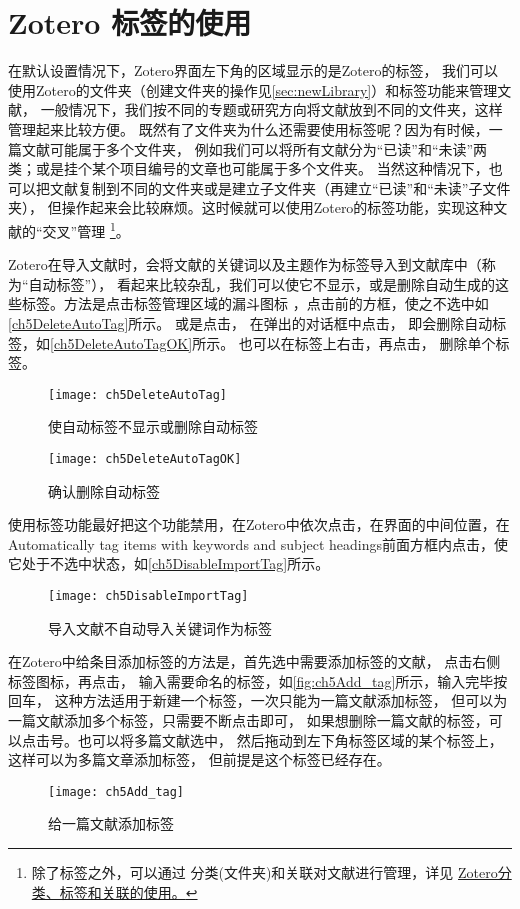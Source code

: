 \documentclass[theorem=false,mathfont=none,openany,sub3section]{easybook}
\begin{document}
{\section{Zotero 标签的使用} \label{sec:tag}
在默认设置情况下，Zotero界面左下角的区域显示的是Zotero的标签，
我们可以使用Zotero的文件夹（创建文件夹的操作见\cref{sec:newLibrary}）和标签功能来管理文献，
一般情况下，我们按不同的专题或研究方向将文献放到不同的文件夹，这样管理起来比较方便。
既然有了文件夹为什么还需要使用标签呢？因为有时候，一篇文献可能属于多个文件夹，
例如我们可以将所有文献分为“已读”和“未读”两类；或是挂个某个项目编号的文章也可能属于多个文件夹。
当然这种情况下，也可以把文献复制到不同的文件夹或是建立子文件夹（再建立“已读”和“未读”子文件夹），
但操作起来会比较麻烦。这时候就可以使用Zotero的标签功能，实现这种文献的“交叉”管理
\footnote{除了标签之外，可以通过
	分类(文件夹)和关联对文献进行管理，详见
	\href{https://zhuanlan.zhihu.com/p/275707703}{Zotero分类、标签和关联的使用。}}。

Zotero在导入文献时，会将文献的关键词以及主题作为标签导入到文献库中（称为“自动标签”），
看起来比较杂乱，我们可以使它不显示，或是删除自动生成的这些标签。方法是点击标签管理区域的漏斗图标
，点击前的方框，使之不选中如\autoref{ch5DeleteAutoTag}所示。
或是点击，
在弹出的对话框中点击，
即会删除自动标签，如\autoref{ch5DeleteAutoTagOK}所示。
也可以在标签上右击，再点击，
删除单个标签。

\begin{figure}[htbp]
	\centering
	\texttt{[image: ch5DeleteAutoTag]}
	\caption{使自动标签不显示或删除自动标签}
	\label{ch5DeleteAutoTag}
\end{figure}
\begin{figure}[htbp]
	\centering
	\texttt{[image: ch5DeleteAutoTagOK]}
	\caption{确认删除自动标签}
	\label{ch5DeleteAutoTagOK}
\end{figure}

使用标签功能最好把这个功能禁用，在Zotero中依次点击，在界面的中间位置，在
Automatically tag items with keywords and subject headings前面方框内点击，使它处于不选中状态，如\autoref{ch5DisableImportTag}所示。
\begin{figure}[htbp]
	\centering
	\texttt{[image: ch5DisableImportTag]}
	\caption{导入文献不自动导入关键词作为标签}
	\label{ch5DisableImportTag}
\end{figure}

在Zotero中给条目添加标签的方法是，首先选中需要添加标签的文献，
点击右侧标签图标，再点击\menu{+}，
输入需要命名的标签，如\autoref{fig:ch5Add_tag}所示，输入完毕按回车，
这种方法适用于新建一个标签，一次只能为一篇文献添加标签，
但可以为一篇文献添加多个标签，只需要不断点击\menu{+}即可，
如果想删除一篇文献的标签，可以点击\menu[,]{-}号。也可以将多篇文献选中，
然后拖动到左下角标签区域的某个标签上，这样可以为多篇文章添加标签，
但前提是这个标签已经存在。
\begin{figure}[htbp]
	\centering
	\texttt{[image: ch5Add\_tag]}
	\caption{给一篇文献添加标签}
	\label{fig:ch5Add_tag}
\end{figure}

}
\end{document}
